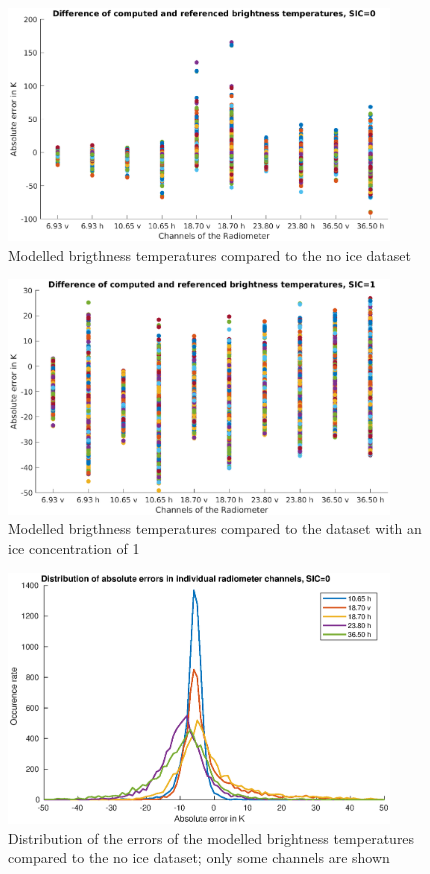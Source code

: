 \documentclass[11pt, a4paper]{article}
\begin{document}
\begin{figure}[h]
   \centering
   \includegraphics[width=0.9\textwidth]{ValidationForward_SIC0.eps}
   \caption{Modelled brigthness temperatures compared to the no ice dataset}
   \label{fig:for0}
\end{figure}

\begin{figure}[h]
   \centering
   \includegraphics[width=0.9\textwidth]{ValidationForward_SIC1.eps}
   \caption{Modelled brigthness temperatures compared to the dataset with an ice concentration of 1}
   \label{fig:for1}
\end{figure}

\begin{figure}[h!]
   \centering
   \includegraphics[width=0.9\textwidth]{ValidationForward_SIC0_errordist.eps}
   \caption{Distribution of the errors of the modelled brightness temperatures compared to the no ice dataset; only some channels are shown}
   \label{fig:for1dist}
\end{figure}
\end{document}
